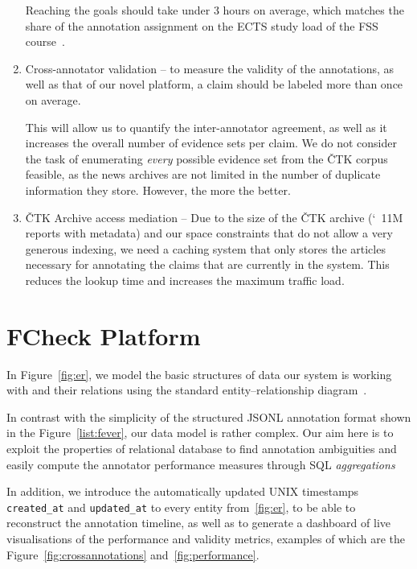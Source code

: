 \begin{enumerate}
    Reaching the goals should take under 3 hours on average, which matches the share of the annotation assignment on the \textsf{ECTS} study load of the \textsf{FSS} course~\cite{ects}.
    
    \item {\techbf Cross-annotator validation} -- to measure the validity of the annotations, as well as that of our novel platform, a claim should be labeled more than once on average.
    
    This will allow us to quantify the inter-annotator agreement, as well as it increases the overall number of evidence sets per claim. We do not consider the task of enumerating \textit{every} possible evidence set from the \textsf{ČTK} corpus feasible, as the news archives are not limited in the number of duplicate information they store. However, the more the better.
    
    \item {\techbf ČTK Archive access mediation} -- Due to the size of the \textsf{ČTK} archive (\char`~11M reports with metadata) and our space constraints that do not allow a very generous indexing, we need a caching system that only stores the articles necessary for annotating the claims that are currently in the system. This reduces the lookup time and increases the maximum traffic load.
\end{enumerate}

\section{FCheck Platform}
In Figure~\ref{fig:er}, we model the basic structures of data our system is working with and their relations using the standard entity--relationship diagram~\cite{10.1145/320434.320440}.

In contrast with the simplicity of the structured \textsf{JSONL} annotation format shown in the Figure~\ref{list:fever}, our data model is rather complex. Our aim here is to exploit the properties of relational database to find annotation ambiguities and easily compute the annotator performance measures through \textsf{SQL} \textit{aggregations}

In addition, we introduce the automatically updated \textsf{UNIX} timestamps \texttt{created\_at} and \texttt{updated\_at} to every entity from~\ref{fig:er}, to be able to reconstruct the annotation timeline, as well as to generate a dashboard of {live} visualisations of the performance and validity metrics, examples of which are the Figure~\ref{fig:crossannotations} and~\ref{fig:performance}.

